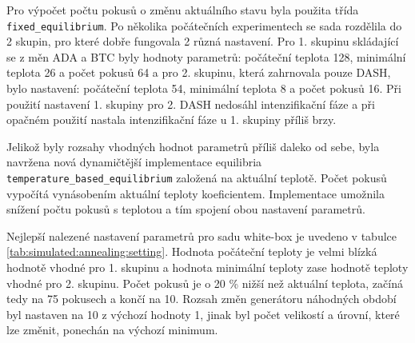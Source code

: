 Pro výpočet počtu pokusů o změnu aktuálního stavu byla použita třída \texttt{fixed\_equilibrium}.
Po několika počátečních experimentech se sada rozdělila do 2 skupin, pro které dobře fungovala 2 různá nastavení.
Pro 1. skupinu skládající se z měn ADA a BTC byly hodnoty parametrů: počáteční teplota 128, minimální teplota 26 a počet pokusů 64 a pro 2. skupinu, která zahrnovala pouze DASH, bylo nastavení: počáteční teplota 54, minimální teplota 8 a počet pokusů 16.
Při použití nastavení 1. skupiny pro 2. DASH nedosáhl intenzifikační fáze a při opačném použití nastala intenzifikační fáze u 1. skupiny příliš brzy.

Jelikož byly rozsahy vhodných hodnot parametrů příliš daleko od sebe, byla navržena nová dynamičtější implementace equilibria  \texttt{temperature\_based\_equilibrium} založená na aktuální teplotě.
Počet pokusů vypočítá vynásobením aktuální teploty koeficientem.
Implementace umožnila snížení počtu pokusů s teplotou a tím spojení obou nastavení parametrů.

Nejlepší nalezené nastavení parametrů pro sadu white-box je uvedeno v tabulce \ref{tab:simulated:annealing:setting}.
Hodnota počáteční teploty je velmi blízká hodnotě vhodné pro 1. skupinu a hodnota minimální teploty zase hodnotě teploty vhodné pro 2. skupinu.
Počet pokusů je o 20 \% nižší než aktuální teplota, začíná tedy na 75 pokusech a končí na 10.
Rozsah změn generátoru náhodných období byl nastaven na 10 z výchozí hodnoty 1, jinak byl počet velikostí a úrovní, které lze změnit, ponechán na výchozí minimum.

